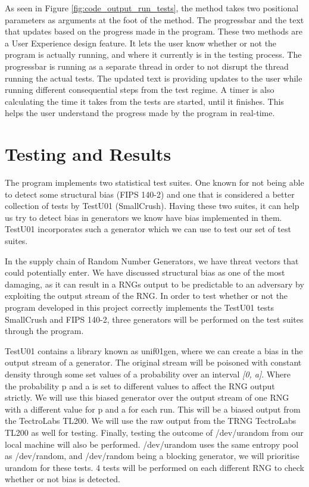 \documentclass[]{final_report}
\begin{document}
\par{As seen in Figure \ref{fig:code_output_run_tests}, the method takes two positional parameters as arguments at the foot of the method. The progressbar and the text that updates based on the progress made in the program. These two methods are a User Experience design feature. It lets the user know whether or not the program is actually running, and where it currently is in the testing process. The progressbar is running as a separate thread in order to not disrupt the thread running the actual tests. The updated text is providing updates to the user while running different consequential steps from the test regime. A timer is also calculating the time it takes from the tests are started, until it finishes. This helps the user understand the progress made by the program in real-time.}

\chapter*{Testing and Results}

\par{The program implements two statistical test suites. One known for not being able to detect some structural bias (FIPS 140-2) and one that is considered a better collection of tests by TestU01 (SmallCrush). Having these two suites, it can help us try to detect bias in generators we know have bias implemented in them. TestU01 incorporates such a generator which we can use to test our set of test suites.}

\par{In the supply chain of Random Number Generators, we have threat vectors that could potentially enter. We have discussed structural bias as one of the most damaging, as it can result in a RNGs output to be predictable to an adversary by exploiting the output stream of the RNG. In order to test whether or not the program developed in this project correctly implements the TestU01 tests SmallCrush and FIPS 140-2, three generators will be performed on the test suites through the program.}

\par{TestU01 contains a library known as unif01gen, where we can create a bias in the output stream of a generator. The original stream will be poisoned with constant density through some set values of a probability over an interval \textit{[0, a]}\cite{Ecuyer:2007}. Where the probability  p and a is set to different values to affect the RNG output strictly. We will use this biased generator over the output stream of one RNG with a different value for p and a for each run. This will be a biased output from the TectroLabs TL200. We will use the raw output from the TRNG TectroLabs TL200 as well for testing. Finally, testing the outcome of /dev/urandom from our local machine will also be performed. /dev/urandom uses the same entropy pool as /dev/random, and /dev/random being a blocking generator, we will prioritise urandom for these tests. 4 tests will be performed on each different RNG to check whether or not bias is detected.}
\end{document}
